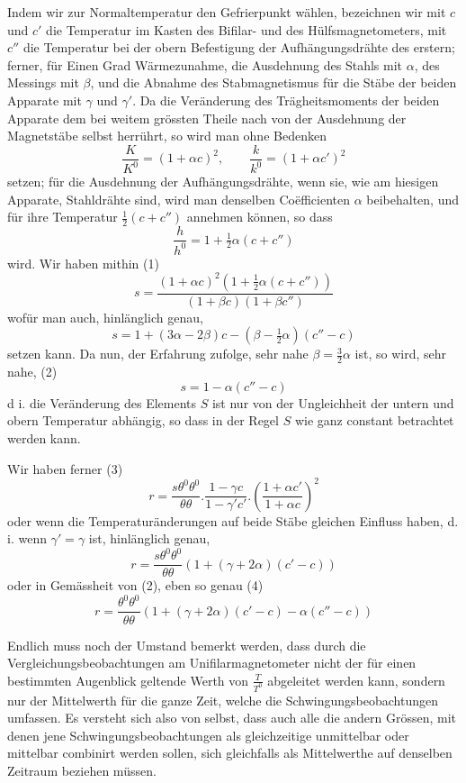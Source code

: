 Indem wir zur Normaltemperatur den Gefrierpunkt wählen, bezeichnen wir mit $c$ und $c'$ die Temperatur im Kasten des Bifilar- und des Hülfsmagnetometers, mit $c''$ die Temperatur bei der obern Befestigung der Aufhängungsdrähte des erstern; ferner, für Einen Grad Wärmezunahme, die Ausdehnung des Stahls mit $\alpha$, des Messings mit $\beta$, und die Abnahme des Stabmagnetismus für die Stäbe der beiden Apparate mit $\gamma$ und $\gamma'$. Da die Veränderung des Trägheitsmoments der beiden Apparate dem bei weitem grössten Theile nach von der Ausdehnung der Magnetstäbe selbst herrührt, so wird man ohne Bedenken
\[
\frac{K}{K^0}=(1+\alpha c)^2,\qquad \frac{k}{k^0}=(1+\alpha c')^2
\]
setzen; für die Ausdehnung der Aufhängungsdrähte, wenn sie, wie am hiesigen Apparate, Stahldrähte sind, wird man denselben Coëfficienten $\alpha$ beibehalten, und für ihre Temperatur $\tfrac{1}{2}(c+c'')$ annehmen können, so dass
\[
\frac{h}{h^0}=1+\tfrac{1}{2}\alpha(c+c'')
\]
wird. Wir haben mithin (1)
\[
s=\frac{(1+\alpha c)^2(1+\tfrac{1}{2}\alpha(c+c''))}{(1+\beta c)(1+\beta c'')}
\]
wofür man auch, hinlänglich genau,
\[
s=1+(3\alpha-2\beta)c-(\beta-\tfrac{1}{2}\alpha)(c''-c)
\]
setzen kann. Da nun, der Erfahrung zufolge, sehr nahe $\beta=\tfrac{3}{2}\alpha$ ist, so wird, sehr nahe, (2)
\[
s=1-\alpha(c''-c)
\]
d i. die Veränderung des Elements $S$ ist nur von der Ungleichheit der untern und obern Temperatur abhängig, so dass in der Regel $S$ wie ganz constant betrachtet werden kann.

Wir haben ferner (3)
\[
r=\frac{s\theta^0\theta^0}{\theta\theta}.\frac{1-\gamma c}{1-\gamma'c'}.\left(\frac{1+\alpha c'}{1+\alpha c}\right)^2
\]
oder wenn die Temperaturänderungen auf beide Stäbe gleichen Einfluss haben, d. i. wenn $\gamma'=\gamma$ ist, hinlänglich genau,
\[
r=\frac{s\theta^0\theta^0}{\theta\theta}(1+(\gamma+2\alpha)(c'-c))
\]
oder in Gemässheit von (2), eben so genau (4)
\[
r=\frac{\theta^0\theta^0}{\theta\theta}(1+(\gamma+2\alpha)(c'-c)-\alpha(c''-c))
\]

Endlich muss noch der Umstand bemerkt werden, dass durch die Vergleichungsbeobachtungen am Unifilarmagnetometer nicht der für einen bestimmten Augenblick geltende Werth von $\frac{T}{T^0}$ abgeleitet werden kann, sondern nur der Mittelwerth für die ganze Zeit, welche die Schwingungsbeobachtungen umfassen. Es versteht sich also von selbst, dass auch alle die andern Grössen, mit denen jene Schwingungsbeobachtungen als gleichzeitige unmittelbar oder mittelbar combinirt werden sollen, sich gleichfalls als Mittelwerthe auf denselben Zeitraum beziehen müssen.

